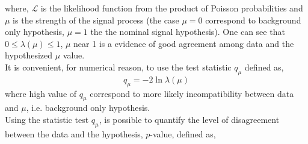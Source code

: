 where, $\mathcal{L}$ is the likelihood function from the product of Poisson probabilities and  $\mu$ is the strength of the signal process (the case $\mu =0$ correspond to background only hypothesis, $\mu=1$ the the nominal signal hypothesis).
One can see that $0 \leq  \lambda (\mu) \leq 1 $, $\mu$ near 1 is a evidence of good agreement among data and the hypothesized $\mu$ value.\\
It is convenient, for numerical reason, to use the test statistic $q_{\mu}$ defined as,  
\begin{equation}
 q_{\mu}= -2 \ln \lambda (\mu)  \end{equation}
where high value of $q_{\mu}$ correspond to  more likely incompatibility between data and $\mu$, i.e. background only hypothesis. \\
Using the statistic test  $q_{\mu}$, is possible to quantify the level of disagreement between the data and the hypothesis, $p$-value, defined as,

